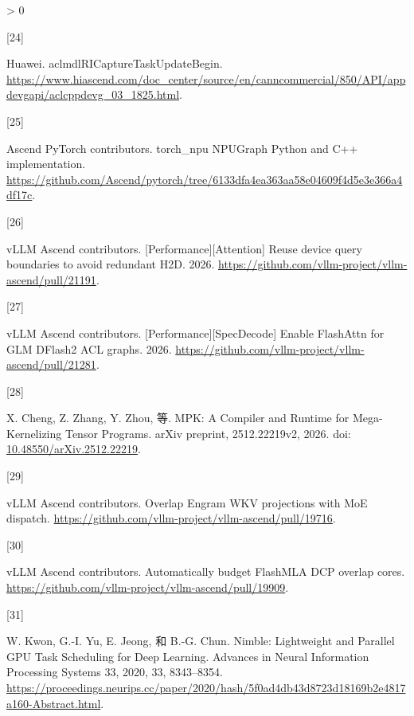 \documentclass[
  UTF8,
  zihao=5]{ctexart}
\newlength{\cslhangindent}
\newlength{\csllabelwidth}
\newenvironment{CSLReferences}[2] %
 {%
  \setlength{\parindent}{0pt}
  \ifodd #1 \everypar{\setlength{\hangindent}{\cslhangindent}}\ignorespaces\fi
  \ifnum #2 > 0
  \setlength{\parskip}{#2\baselineskip}
  \fi
 }%
 {}
\newcommand{\CSLLeftMargin}[1]{\parbox[t]{\csllabelwidth}{#1}}
\newcommand{\CSLRightInline}[1]{\parbox[t]{\linewidth - \csllabelwidth}{#1}\par}
\begin{document}
\begin{CSLReferences}{0}{0}
\leavevmode{}%
\CSLLeftMargin{{[}24{]} }%
\CSLRightInline{Huawei. {aclmdlRICaptureTaskUpdateBegin}.
\url{https://www.hiascend.com/doc_center/source/en/canncommercial/850/API/appdevgapi/aclcppdevg_03_1825.html}.}

\leavevmode{}%
\CSLLeftMargin{{[}25{]} }%
\CSLRightInline{Ascend PyTorch contributors. {torch\_npu NPUGraph Python
and C++ implementation}.
\url{https://github.com/Ascend/pytorch/tree/6133dfa4ea363aa58e04609f4d5e3e366a4df17c}.}

\leavevmode{}%
\CSLLeftMargin{{[}26{]} }%
\CSLRightInline{vLLM Ascend contributors.
{{[}Performance{]}{[}Attention{]} Reuse device query boundaries to avoid
redundant H2D}. 2026.
\url{https://github.com/vllm-project/vllm-ascend/pull/21191}.}

\leavevmode{}%
\CSLLeftMargin{{[}27{]} }%
\CSLRightInline{vLLM Ascend contributors.
{{[}Performance{]}{[}SpecDecode{]} Enable FlashAttn for GLM DFlash2 ACL
graphs}. 2026.
\url{https://github.com/vllm-project/vllm-ascend/pull/21281}.}

\leavevmode{}%
\CSLLeftMargin{{[}28{]} }%
\CSLRightInline{X. Cheng, Z. Zhang, Y. Zhou, 等. MPK: A Compiler and
Runtime for Mega-Kernelizing Tensor Programs. arXiv preprint,
2512.22219v2, 2026. doi:
\href{https://doi.org/10.48550/arXiv.2512.22219}{10.48550/arXiv.2512.22219}.}

\leavevmode{}%
\CSLLeftMargin{{[}29{]} }%
\CSLRightInline{vLLM Ascend contributors. {Overlap Engram WKV
projections with MoE dispatch}.
\url{https://github.com/vllm-project/vllm-ascend/pull/19716}.}

\leavevmode{}%
\CSLLeftMargin{{[}30{]} }%
\CSLRightInline{vLLM Ascend contributors. {Automatically budget FlashMLA
DCP overlap cores}.
\url{https://github.com/vllm-project/vllm-ascend/pull/19909}.}

\leavevmode{}%
\CSLLeftMargin{{[}31{]} }%
\CSLRightInline{W. Kwon, G.-I. Yu, E. Jeong, 和 B.-G. Chun. Nimble:
Lightweight and Parallel GPU Task Scheduling for Deep Learning. Advances
in Neural Information Processing Systems 33, 2020, 33, 8343--8354.
\url{https://proceedings.neurips.cc/paper/2020/hash/5f0ad4db43d8723d18169b2e4817a160-Abstract.html}.}


\end{CSLReferences}
\end{document}
